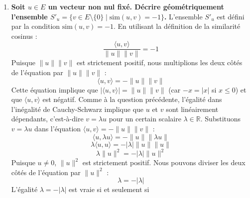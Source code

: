 \documentclass[11pt,a4paper]{report}
\begin{document}
\begin{enumerate}
  signifie qu'il existe un scalaire \(\lambda \in \mathbb{R}\) tel que
  \(v = \lambda u\). Substituons \(v = \lambda u\) dans l'équation
  \(\langle u, v \rangle = \|u\| \|v\|\) :
  \[\langle u, \lambda u \rangle = \|u\| \|\lambda u\|\] En utilisant
  les propriétés de linéarité du produit scalaire et de la norme :
  \[\lambda \langle u, u \rangle = |\lambda| \|u\| \|u\|\]
  \[\lambda \|u\|^2 = |\lambda| \|u\|^2\] Puisque \(u \ne 0\),
  \(\|u\|^2\) est strictement positif. Nous pouvons diviser les deux
  côtés de l'équation par \(\|u\|^2\) : \[\lambda = |\lambda|\]
  L'égalité \(\lambda = |\lambda|\) est vraie si et seulement si
  \(\lambda \ge 0\). De plus, la définition de \(S_u\) exige que
  \(v \ne 0\). Si \(\lambda = 0\), alors \(v = 0 \cdot u = 0\), ce qui
  contredit la condition \(v \in E \setminus \{0\}\). Par conséquent,
  \(\lambda\) doit être strictement positif. Ainsi, l'ensemble \(S_u\)
  est l'ensemble des vecteurs \(v\) qui sont des multiples scalaires
  strictement positifs de \(u\). Géométriquement, \(S_u\) représente la
  demi-droite ouverte issue de l'origine et passant par le vecteur
  \(u\). Tous les vecteurs de \(S_u\) sont colinéaires à \(u\) et ont la
  même direction que \(u\).
\item
  \textbf{Soit \(u \in E\) un vecteur non nul fixé. Décrire
  géométriquement l'ensemble
  \(S'_u = \{v \in E \setminus \{0\} \mid \text{sim}(u, v) = -1\}\).}
  L'ensemble \(S'_u\) est défini par la condition
  \(\text{sim}(u, v) = -1\). En utilisant la définition de la similarité
  cosinus : \[\frac{\langle u, v \rangle}{\|u\| \|v\|} = -1\] Puisque
  \(\|u\| \|v\|\) est strictement positif, nous multiplions les deux
  côtés de l'équation par \(\|u\| \|v\|\) :
  \[\langle u, v \rangle = -\|u\| \|v\|\] Cette équation implique que
  \(|\langle u, v \rangle| = \|u\| \|v\|\) (car \(-x = |x|\) si
  \(x \le 0\)) et que \(\langle u, v \rangle\) est négatif. Comme à la
  question précédente, l'égalité dans l'inégalité de Cauchy-Schwarz
  implique que \(u\) et \(v\) sont linéairement dépendants, c'est-à-dire
  \(v = \lambda u\) pour un certain scalaire \(\lambda \in \mathbb{R}\).
  Substituons \(v = \lambda u\) dans l'équation
  \(\langle u, v \rangle = -\|u\| \|v\|\) :
  \[\langle u, \lambda u \rangle = -\|u\| \|\lambda u\|\]
  \[\lambda \langle u, u \rangle = -|\lambda| \|u\| \|u\|\]
  \[\lambda \|u\|^2 = -|\lambda| \|u\|^2\] Puisque \(u \ne 0\),
  \(\|u\|^2\) est strictement positif. Nous pouvons diviser les deux
  côtés de l'équation par \(\|u\|^2\) : \[\lambda = -|\lambda|\]
  L'égalité \(\lambda = -|\lambda|\) est vraie si et seulement si

\end{enumerate}
\end{document}
